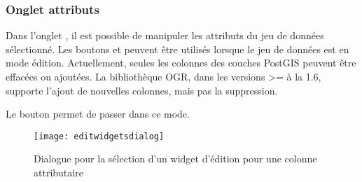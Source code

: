 \subsubsection{Onglet attributs}\label{label_attributes}
Dans l'onglet , il est possible de manipuler les attributs du jeu de données sélectionné. Les boutons  et  peuvent être utilisés lorsque le jeu de données est en mode édition. Actuellement, seules les colonnes des couches PostGIS peuvent être effacées ou ajoutées. La bibliothèque OGR, dans les versions >= à la 1.6, supporte l'ajout de nouvelles colonnes, mais pas la suppression.

Le bouton  permet de passer dans ce mode.


\begin{figure}[H]
   \begin{center}
   \caption{Dialogue pour la sélection d'un widget d'édition pour une colonne attributaire \nixcaption}\label{fig:editwidget}\smallskip
   \texttt{[image: editwidgetsdialog]}
\end{center}
\end{figure}

